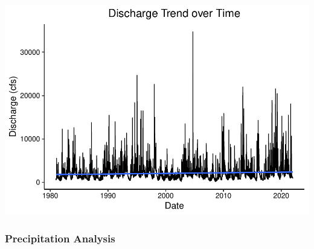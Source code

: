 \documentclass[
]{article}
\begin{document}
\includegraphics{SD_AD_NVT_EDAfinal_files/figure-latex/unnamed-chunk-11-1.pdf}
\newpage

\hypertarget{precipitation-analysis}{%
\subsubsection{\texorpdfstring{\textbf{Precipitation
Analysis}}{Precipitation Analysis}}\label{precipitation-analysis}}
\end{document}
